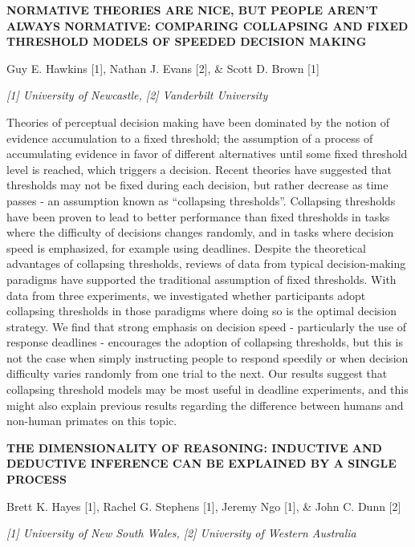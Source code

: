 \documentclass[]{article}
\begin{document}
\textbf{NORMATIVE THEORIES ARE NICE, BUT PEOPLE AREN'T ALWAYS NORMATIVE:
COMPARING COLLAPSING AND FIXED THRESHOLD MODELS OF SPEEDED DECISION
MAKING}

Guy E. Hawkins {[}1{]}, Nathan J. Evans {[}2{]}, \& Scott D. Brown
{[}1{]}

\emph{{[}1{]} University of Newcastle, {[}2{]} Vanderbilt University}

Theories of perceptual decision making have been dominated by the notion
of evidence accumulation to a fixed threshold; the assumption of a
process of accumulating evidence in favor of different alternatives
until some fixed threshold level is reached, which triggers a decision.
Recent theories have suggested that thresholds may not be fixed during
each decision, but rather decrease as time passes - an assumption known
as ``collapsing thresholds''. Collapsing thresholds have been proven to
lead to better performance than fixed thresholds in tasks where the
difficulty of decisions changes randomly, and in tasks where decision
speed is emphasized, for example using deadlines. Despite the
theoretical advantages of collapsing thresholds, reviews of data from
typical decision-making paradigms have supported the traditional
assumption of fixed thresholds. With data from three experiments, we
investigated whether participants adopt collapsing thresholds in those
paradigms where doing so is the optimal decision strategy. We find that
strong emphasis on decision speed - particularly the use of response
deadlines - encourages the adoption of collapsing thresholds, but this
is not the case when simply instructing people to respond speedily or
when decision difficulty varies randomly from one trial to the next. Our
results suggest that collapsing threshold models may be most useful in
deadline experiments, and this might also explain previous results
regarding the difference between humans and non-human primates on this
topic.

\textbf{THE DIMENSIONALITY OF REASONING: INDUCTIVE AND DEDUCTIVE
INFERENCE CAN BE EXPLAINED BY A SINGLE PROCESS}

Brett K. Hayes {[}1{]}, Rachel G. Stephens {[}1{]}, Jeremy Ngo {[}1{]},
\& John C. Dunn {[}2{]}

\emph{{[}1{]} University of New South Wales, {[}2{]} University of
Western Australia}
\end{document}
